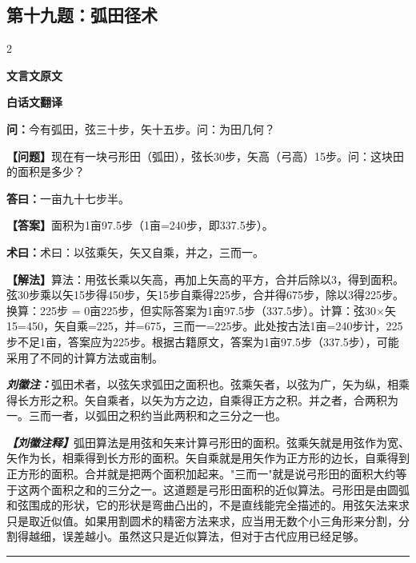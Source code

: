 \documentclass[10pt,a4paper]{article}
\newcommand{\wen}[1]{\textbf{\color{problemcolor}问：}#1\par}
\newcommand{\da}[1]{\textbf{答曰：}#1\par}
\newcommand{\shu}[1]{\textbf{术曰：}#1\par}
\newcommand{\liuhui}[1]{{\color{commentarycolor}\textit{\textbf{刘徽注：}}#1\par}}
\newcommand{\classicalheader}[1]{{\centering\large\bfseries\color{classicalcolor} #1\par\vspace{0.5em}}}
\newcommand{\wenmodern}[1]{\textbf{\color{moderncolor}【问题】}#1\par}
\newcommand{\damodern}[1]{\textbf{【答案】}#1\par}
\newcommand{\shumodern}[1]{\textbf{【解法】}#1\par}
\newcommand{\liuhuimodern}[1]{{\color{commentarycolor}\textit{\textbf{【刘徽注释】}}#1\par}}
\newcommand{\modernheader}[1]{{\centering\large\bfseries\color{moderncolor} #1\par\vspace{0.5em}}}
\newcommand{\problemsec}[1]{\subsection*{#1}}
\begin{document}
\problemsec{第十九题：弧田径术}
\begin{paracol}{2}
\classicalheader{文言文原文}
\switchcolumn
\modernheader{白话文翻译}
\switchcolumn*

\wen{今有弧田，弦三十步，矢十五步。问：为田几何？}

\switchcolumn

\wenmodern{现在有一块弓形田（弧田），弦长30步，矢高（弓高）15步。问：这块田的面积是多少？}

\switchcolumn*

\da{一亩九十七步半。}

\switchcolumn

\damodern{面积为1亩97.5步（1亩=240步，即337.5步）。}

\switchcolumn*

\shu{术曰：以弦乘矢，矢又自乘，并之，三而一。}

\switchcolumn

\shumodern{算法：用弦长乘以矢高，再加上矢高的平方，合并后除以3，得到面积。弦30步乘以矢15步得450步，矢15步自乘得225步，合并得675步，除以3得225步。换算：225步 = 0亩225步，但实际答案为1亩97.5步（337.5步）。计算：弦30×矢15=450，矢自乘=225，并=675，三而一=225步。此处按古法1亩=240步计，225步不足1亩，答案应为225步。根据古籍原文，答案为1亩97.5步（337.5步），可能采用了不同的计算方法或亩制。}

\switchcolumn*

\liuhui{弧田术者，以弦矢求弧田之面积也。弦乘矢者，以弦为广，矢为纵，相乘得长方形之积。矢自乘者，以矢为方之边，自乘得正方之积。并之者，合两积为一。三而一者，以弧田之积约当此两积和之三分之一也。}

\switchcolumn

\liuhuimodern{弧田算法是用弦和矢来计算弓形田的面积。弦乘矢就是用弦作为宽、矢作为长，相乘得到长方形的面积。矢自乘就是用矢作为正方形的边长，自乘得到正方形的面积。合并就是把两个面积加起来。"三而一"就是说弓形田的面积大约等于这两个面积之和的三分之一。这道题是弓形田面积的近似算法。弓形田是由圆弧和弦围成的形状，它的形状是弯曲凸出的，不是直线能完全描述的。用弦矢法来求只是取近似值。如果用割圆术的精密方法来求，应当用无数个小三角形来分割，分割得越细，误差越小。虽然这只是近似算法，但对于古代应用已经足够。}

\end{paracol}

\vspace{0.3cm}
\hrule
\vspace{0.3cm}
\end{document}
